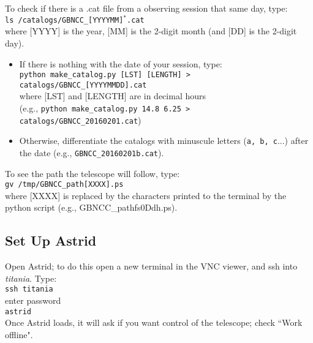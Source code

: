 \documentclass[11pt]{article}
\begin{document}
\noindent To check if there is a .cat file from a observing session that same day, type: \\
\texttt{ls /catalogs/GBNCC\_[YYYYMM]$^*$.cat} \\
where [YYYY] is the year, [MM] is the 2-digit month (and [DD] is the 2-digit day). \begin{itemize}
\item If there is nothing with the date of your session, type: \\
\texttt{python make\_catalog.py [LST] [LENGTH] > catalogs/GBNCC\_[YYYYMMDD].cat} \\
where [LST] and [LENGTH] are in decimal hours \\
(e.g., \texttt{python make\_catalog.py 14.8 6.25 > catalogs/GBNCC\_20160201.cat})
\item Otherwise, differentiate the catalogs with minuscule letters (\texttt{a, b, c}...) after the date (e.g., \texttt{GBNCC\_20160201b.cat}). \end{itemize}

\noindent To see the path the telescope will follow, type: \\
\texttt{gv /tmp/GBNCC\_path[XXXX].ps}\\
where [XXXX] is replaced by the characters printed to the terminal by the python script (e.g., GBNCC\_pathfs0Ddh.ps).



\subsection{Set Up Astrid}\label{ssec:astrid}  %
Open Astrid; to do this open a new terminal in the VNC viewer, and ssh into \textit{titania}.  Type: \\
\indent\texttt{ssh titania} \\
\indent enter password \\
\indent\texttt{astrid} \\
Once Astrid loads, it will ask if you want control of the telescope; check ``Work offline".
\end{document}
